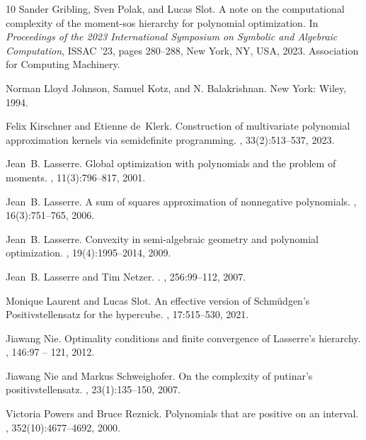 \documentclass[11pt]{article}
\theoremstyle{definition}
\begin{document}
\begin{thebibliography}{10}
Sander Gribling, Sven Polak, and Lucas Slot.
\newblock A note on the computational complexity of the moment-sos hierarchy
  for polynomial optimization.
\newblock In {\em Proceedings of the 2023 International Symposium on Symbolic
  and Algebraic Computation}, ISSAC '23, pages 280--288, New York, NY, USA,
  2023. Association for Computing Machinery.

{
Norman Lloyd Johnson, Samuel Kotz, and N. Balakrishnan.  \newblock  New York: Wiley, 1994.
}

Felix Kirschner and Etienne de~Klerk.
\newblock Construction of multivariate polynomial approximation kernels via
  semidefinite programming.
, 33(2):513--537, 2023.

Jean~B. Lasserre.
\newblock Global optimization with polynomials and the problem of moments.
, 11(3):796--817, 2001.

Jean~B. Lasserre.
\newblock A sum of squares approximation of nonnegative polynomials.
, 16(3):751--765, 2006.

Jean~B. Lasserre.
\newblock Convexity in semi-algebraic geometry and polynomial optimization.
, 19(4):1995--2014, 2009.

Jean~B. {Lasserre} and Tim {Netzer}.
.
, 256:99--112, 2007.

Monique Laurent and Lucas Slot.
\newblock An effective version of {S}chm{\"u}dgen’s {P}ositivstellensatz for
  the hypercube.
, 17:515--530, 2021.

Jiawang Nie.
\newblock Optimality conditions and finite convergence of {L}asserre's
  hierarchy.
, 146:97 -- 121, 2012.

Jiawang Nie and Markus Schweighofer.
\newblock On the complexity of putinar's positivstellensatz.
, 23(1):135--150, 2007.

Victoria Powers and Bruce Reznick.
\newblock Polynomials that are positive on an interval.
,
  352(10):4677--4692, 2000.


\end{thebibliography}
\end{document}
